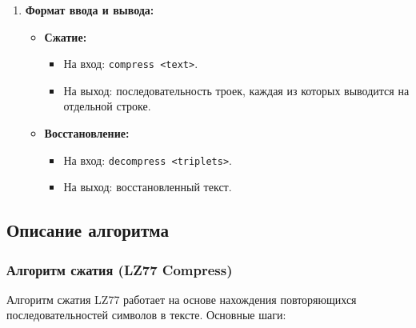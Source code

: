 \begin{enumerate}
  \item \textbf{Формат ввода и вывода:}
  \begin{itemize}
    \item \textbf{Сжатие:}
      \begin{itemize}
        \item На вход: \texttt{compress <text>}.
        \item На выход: последовательность троек, каждая из которых выводится на отдельной строке.
      \end{itemize}
    \item \textbf{Восстановление:}
      \begin{itemize}
        \item На вход: \texttt{decompress <triplets>}.
        \item На выход: восстановленный текст.
      \end{itemize}
  \end{itemize}
\end{enumerate}

\subsection*{Описание алгоритма}

\subsubsection*{Алгоритм сжатия (LZ77 Compress)}

Алгоритм сжатия LZ77 работает на основе нахождения повторяющихся последовательностей символов в тексте. Основные шаги:

